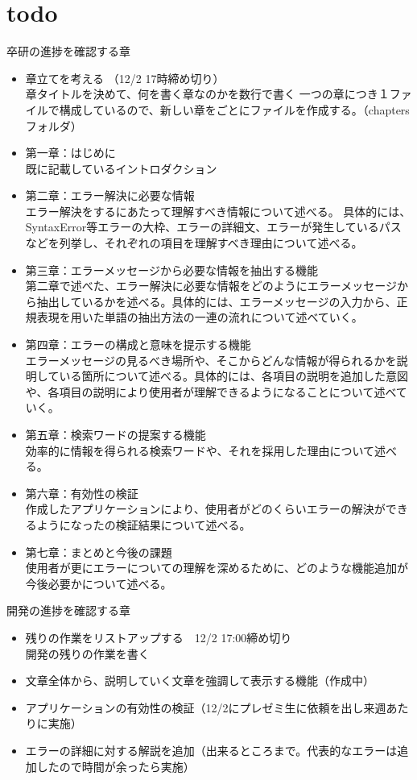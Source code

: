 \documentclass[main]{subfiles}
\begin{document}
\chapter{todo}
\label{cha:intro}
    卒研の進捗を確認する章
\begin{itemize}
    \item 章立てを考える （12/2 17時締め切り）\\
        章タイトルを決めて、何を書く章なのかを数行で書く
        一つの章につき１ファイルで構成しているので、新しい章をごとにファイルを作成する。（chaptersフォルダ）
        
    \item 第一章：はじめに
    \mbox{}\\ 既に記載しているイントロダクション
    \item 第二章：エラー解決に必要な情報
    \mbox{}\\ エラー解決をするにあたって理解すべき情報について述べる。 具体的には、SyntaxError等エラーの大枠、エラーの詳細文、エラーが発生しているパスなどを列挙し、それぞれの項目を理解すべき理由について述べる。
    \item 第三章：エラーメッセージから必要な情報を抽出する機能
    \mbox{}\\ 第二章で述べた、エラー解決に必要な情報をどのようにエラーメッセージから抽出しているかを述べる。具体的には、エラーメッセージの入力から、正規表現を用いた単語の抽出方法の一連の流れについて述べていく。
    \item 第四章：エラーの構成と意味を提示する機能
    \mbox{}\\ エラーメッセージの見るべき場所や、そこからどんな情報が得られるかを説明している箇所について述べる。具体的には、各項目の説明を追加した意図や、各項目の説明により使用者が理解できるようになることについて述べていく。
    \item 第五章：検索ワードの提案する機能
    \mbox{}\\ 効率的に情報を得られる検索ワードや、それを採用した理由について述べる。
    
    \item 第六章：有効性の検証\mbox{}\\ 作成したアプリケーションにより、使用者がどのくらいエラーの解決ができるようになったの検証結果について述べる。
    \item 第七章：まとめと今後の課題
    \mbox{}\\ 使用者が更にエラーについての理解を深めるために、どのような機能追加が今後必要かについて述べる。

    
\end{itemize}
開発の進捗を確認する章
    \begin{itemize}
        \item 残りの作業をリストアップする　12/2 17:00締め切り \\
            開発の残りの作業を書く
        \item 文章全体から、説明していく文章を強調して表示する機能（作成中）
        \item アプリケーションの有効性の検証（12/2にプレゼミ生に依頼を出し来週あたりに実施）
        \item エラーの詳細に対する解説を追加（出来るところまで。代表的なエラーは追加したので時間が余ったら実施）
    \end{itemize}
\end{document}

